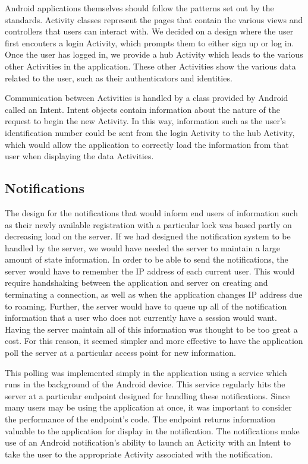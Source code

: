 \documentclass[12pt]{report}
\let\Oldsubsection\subsection
\renewcommand{\subsection}{\FloatBarrier\Oldsubsection}
\begin{document}
Android applications themselves should follow the patterns set out by the standards. Activity classes represent the
pages that contain the various views and controllers that users can interact with. We decided on a design where the user
first encouters a login Activity, which prompts them to either sign up or log in. Once the user has logged in, we
provide a hub Activity which leads to the various other Activities in the application. These other Activities show the
various data related to the user, such as their authenticators and identities.

Communication between Activities is handled by a class provided by Android called an Intent. Intent objects contain
information about the nature of the request to begin the new Activity. In this way, information such as the user's
identification number could be sent from the login Activity to the hub Activity, which would allow the application to
correctly load the information from that user when displaying the data Activities.


\subsection{Notifications} \label{notifications}

The design for the notifications that would inform end users of information such as their newly available registration
with a particular lock was based partly on decreasing load on the server. If we had designed the notification system to
be handled by the server, we would have needed the server to maintain a large amount of state information. In order to
be able to send the notifications, the server would have to remember the IP address of each current user. This would
require handshaking between the application and server on creating and terminating a connection, as well as when the
application changes IP address due to roaming. Further, the server would have to queue up all of the notification
information that a user who does not currently have a session would want. Having the server maintain all of this
information was thought to be too great a cost. For this reason, it seemed simpler and more effective to have the
application poll the server at a particular access point for new information.

This polling was implemented simply in the application using a service which runs in the background of the Android
device. This service regularly hits the server at a particular endpoint designed for handling these notifications. Since
many users may be using the application at once, it was important to consider the performance of the endpoint's code.
The endpoint returns information valuable to the application for display in the notification. The notifications make use
of an Android notification's ability to launch an Acticity with an Intent to take the user to the appropriate Activity
associated with the notification.
\end{document}
